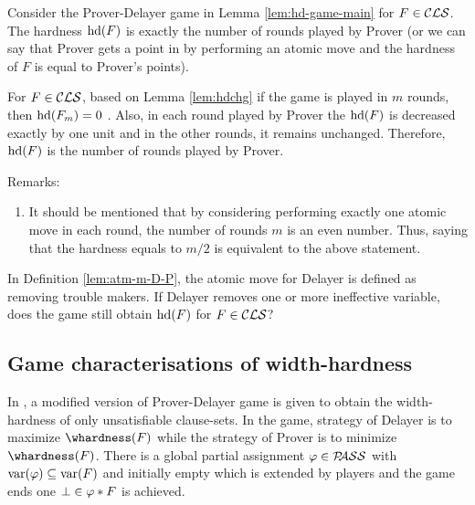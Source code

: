 \documentclass{report}
\begin{document}
\begin{lem}\label{lem:gameres1}
Consider the Prover-Delayer game in Lemma \ref{lem:hd-game-main} for $F \in \mathcal{CLS}$. The hardness $\operatorname{hd}(F)$ is exactly the number of rounds played by Prover (or we can say that Prover gets a point in by performing an atomic move and the hardness of $F$ is equal to Prover's points).
\end{lem}
\begin{prf}
For $F \in \mathcal{CLS}$, based on Lemma \ref{lem:hdchg} if the game is played in $m$ rounds, then $\operatorname{hd}(F_m)=0$ . Also, in each round played by Prover the $\operatorname{hd}(F)$ is decreased exactly by one unit and in the other rounds, it remains unchanged. Therefore, $\operatorname{hd}(F)$ is the number of rounds played by Prover.
\end{prf}
Remarks:
  \begin{enumerate}
  \item It should be mentioned that by considering performing exactly one atomic move in each round, the number of rounds $m$ is an even number. Thus, saying that the hardness equals to $m / 2$ is equivalent to the above statement.
  \end{enumerate}
  
\begin{quest}\label{que:game-move}
In Definition \ref{lem:atm-m-D-P}, the atomic move for Delayer is defined as removing trouble makers. If Delayer removes one or more ineffective variable, does the game still obtain $\operatorname{hd}(F)$ for $F \in \mathcal{CLS}$?
\end{quest}
\subsection{Game characterisations of width-hardness}
\label{sec:game-whdf}

In \cite{BeyersdorffKullmann2014PHP}, a modified version of Prover-Delayer game is given to obtain the width-hardness of only unsatisfiable clause-sets. In the game, strategy of Delayer is to maximize $\whardness(F)$ while the strategy of Prover is to minimize $\whardness(F)$. There is a global partial  assignment $\varphi \in \mathcal{P\hspace{-0.32em}ASS}$ with $\operatorname{var}(\varphi) \subseteq \operatorname{var}(F)$ and initially empty which is extended by players and the game ends one $\bot \in \varphi * F$ is achieved.
\end{document}
